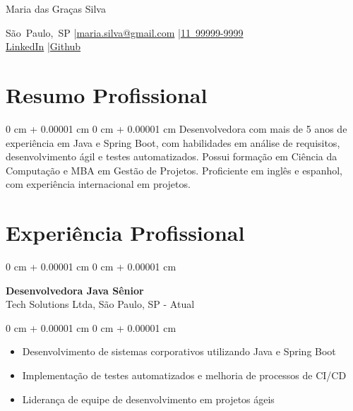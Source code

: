 \documentclass[10pt, letterpaper]{article}
\newenvironment{highlights}{
    \begin{itemize}[
        topsep=0.10 cm,
        parsep=0.10 cm,
        partopsep=0pt,
        itemsep=0pt,
        leftmargin=0 cm + 10pt
    ]
}{
    \end{itemize}
}
\newenvironment{onecolentry}{
    \begin{adjustwidth}{
        0 cm + 0.00001 cm
    }{
        0 cm + 0.00001 cm
    }
}{
    \end{adjustwidth}
}
\newenvironment{header}{
    \setlength{\topsep}{0pt}\par\kern\topsep\centering\linespread{1.5}
}{
    \par\kern\topsep
}
\begin{document}
\begin{header}
    {\fontsize{25pt}{25pt}\selectfont Maria das Graças Silva}

    \vspace{0pt}

    \normalsize
    \mbox{São Paulo, SP} \enskip|\enskip \mbox{\href{mailto:maria.silva@gmail.com}{maria.silva@gmail.com}} \enskip|\enskip \mbox{\href{tel:11999999999}{11 99999-9999}} \\
    \mbox{\href{https://www.linkedin.com/in/maria-silva}{LinkedIn}} \enskip|\enskip \mbox{\href{https://github.com/mariasilva}{Github}}
\end{header}

\vspace{5pt - 0.1cm}

\section{Resumo Profissional}
\begin{onecolentry}{Desenvolvedora com mais de 5 anos de experiência em Java e Spring Boot, com habilidades em análise de requisitos, desenvolvimento ágil e testes automatizados. Possui formação em Ciência da Computação e MBA em Gestão de Projetos. Proficiente em inglês e espanhol, com experiência internacional em projetos.}\end{onecolentry}
\section{Experiência Profissional}

\begin{onecolentry}
    \setcolumnwidth{\fill, 4.5cm}
    \begin{paracol}{2}
        \textbf{Desenvolvedora Java Sênior} \\ Tech Solutions Ltda, São Paulo, SP
        \switchcolumn
         - Atual
    \end{paracol}
\end{onecolentry}
\vspace{0.10cm}
\begin{onecolentry}
    \begin{highlights}
                \item Desenvolvimento de sistemas corporativos utilizando Java e Spring Boot
                \item Implementação de testes automatizados e melhoria de processos de CI/CD
                \item Liderança de equipe de desenvolvimento em projetos ágeis
    \end{highlights}
\end{onecolentry}
\end{document}
